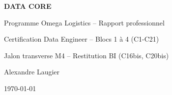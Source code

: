 \documentclass[a4paper,11pt]{report}
\begin{document}
\begin{titlepage}
  \centering
  \vspace*{2cm}
  {\Huge\bfseries DATA CORE\par}
  \vspace{0.5cm}
  {\Large Programme Omega Logistics -- Rapport professionnel\par}
  \vspace{2cm}
  {\large Certification Data Engineer -- Blocs 1 à 4 (C1-C21)\par}
  \vspace{0.3cm}
  {\large Jalon transverse M4 -- Restitution BI (C16bis, C20bis)\par}
  \vfill
  {\large Alexandre Laugier\par}
  {\large \today\par}
\end{titlepage}

\tableofcontents











\appendix


\end{document}
